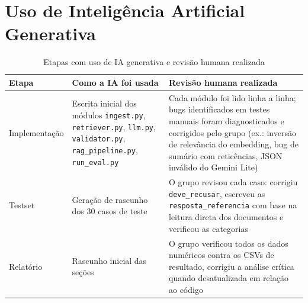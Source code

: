 \documentclass[
  12pt,
  a4paper,
  brazil,
  article,
  oneside,
  sumario=tradicional
]{abntex2}
\begin{document}
\section*{Uso de Inteligência Artificial Generativa}

\begin{table}[H]
\caption{Etapas com uso de IA generativa e revisão humana realizada}
\label{tab:ia}
\centering\small
\begin{tabularx}{\textwidth}{p{2.8cm}XX}
\toprule
\textbf{Etapa} & \textbf{Como a IA foi usada} & \textbf{Revisão humana realizada} \\
\midrule
Implementação & Escrita inicial dos módulos \texttt{ingest.py}, \texttt{retriever.py}, \texttt{llm.py}, \texttt{validator.py}, \texttt{rag\_pipeline.py}, \texttt{run\_eval.py} & Cada módulo foi lido linha a linha; bugs identificados em testes manuais foram diagnosticados e corrigidos pelo grupo (ex.: inversão de relevância do embedding, bug de sumário com reticências, JSON inválido do Gemini Lite) \\
Testset & Geração de rascunho dos 30 casos de teste & O grupo revisou cada caso: corrigiu \texttt{deve\_recusar}, escreveu as \texttt{resposta\_referencia} com base na leitura direta dos documentos e verificou as categorias \\
Relatório & Rascunho inicial das seções & O grupo verificou todos os dados numéricos contra os CSVs de resultado, corrigiu a análise crítica quando desatualizada em relação ao código \\
\bottomrule
\end{tabularx}
\end{table}
\end{document}
